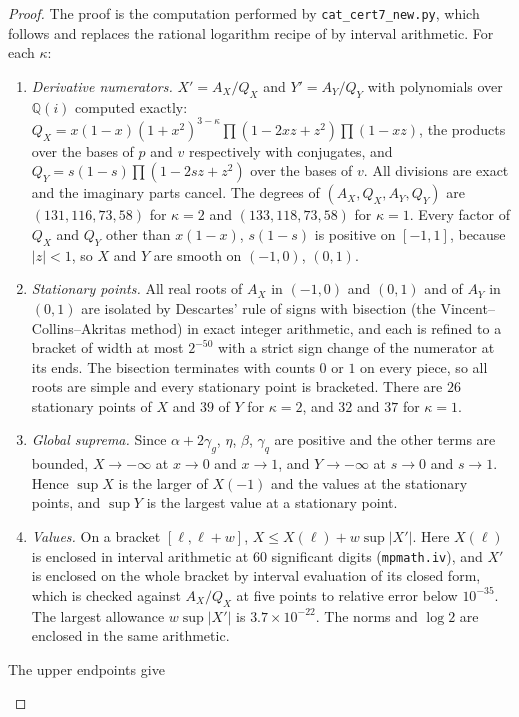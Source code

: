 \documentclass[11pt]{article}
\theoremstyle{definition}
\begin{document}
\begin{proof}
The proof is the computation performed by \texttt{cat\_cert7\_new.py}, which follows \cite[Secs.~7.2--7.4]{OAI} and replaces the rational logarithm recipe of \cite[Sec.~7.3]{OAI} by interval arithmetic. For each $\kappa$:
\begin{enumerate}
\item \emph{Derivative numerators.} $X'=A_X/Q_X$ and $Y'=A_Y/Q_Y$ with polynomials over $\mathbb Q(i)$ computed exactly: $Q_X=x(1-x)(1+x^2)^{3-\kappa}\prod(1-2xz+z^2)\prod(1-xz)$, the products over the bases of $p$ and $v$ respectively with conjugates, and $Q_Y=s(1-s)\prod(1-2sz+z^2)$ over the bases of $v$. All divisions are exact and the imaginary parts cancel. The degrees of $(A_X,Q_X,A_Y,Q_Y)$ are $(131,116,73,58)$ for $\kappa=2$ and $(133,118,73,58)$ for $\kappa=1$. Every factor of $Q_X$ and $Q_Y$ other than $x(1-x)$, $s(1-s)$ is positive on $[-1,1]$, because $|z|<1$, so $X$ and $Y$ are smooth on $(-1,0)$, $(0,1)$.
\item \emph{Stationary points.} All real roots of $A_X$ in $(-1,0)$ and $(0,1)$ and of $A_Y$ in $(0,1)$ are isolated by Descartes' rule of signs with bisection (the Vincent--Collins--Akritas method) in exact integer arithmetic, and each is refined to a bracket of width at most $2^{-50}$ with a strict sign change of the numerator at its ends. The bisection terminates with counts $0$ or $1$ on every piece, so all roots are simple and every stationary point is bracketed. There are $26$ stationary points of $X$ and $39$ of $Y$ for $\kappa=2$, and $32$ and $37$ for $\kappa=1$.
\item \emph{Global suprema.} Since $\alpha+2\gamma_g$, $\eta$, $\beta$, $\gamma_q$ are positive and the other terms are bounded, $X\to-\infty$ at $x\to0$ and $x\to1$, and $Y\to-\infty$ at $s\to0$ and $s\to1$. Hence $\sup X$ is the larger of $X(-1)$ and the values at the stationary points, and $\sup Y$ is the largest value at a stationary point.
\item \emph{Values.} On a bracket $[\ell,\ell+w]$, $X\le X(\ell)+w\sup|X'|$. Here $X(\ell)$ is enclosed in interval arithmetic at $60$ significant digits (\texttt{mpmath.iv}), and $X'$ is enclosed on the whole bracket by interval evaluation of its closed form, which is checked against $A_X/Q_X$ at five points to relative error below $10^{-35}$. The largest allowance $w\sup|X'|$ is $3.7\times10^{-22}$. The norms and $\log2$ are enclosed in the same arithmetic.
\end{enumerate}
The upper endpoints give
\begin{center}

\end{center}
\end{proof}
\end{document}
